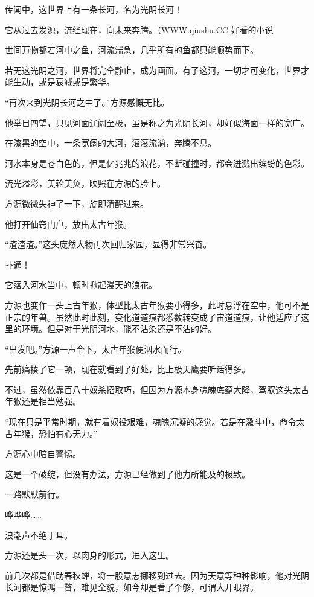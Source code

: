 
\begin{this_body}

传闻中，这世界上有一条长河，名为光阴长河！

它从过去发源，流经现在，向未来奔腾。（WWW.qiushu.CC 好看的小说

世间万物都若河中之鱼，河流湍急，几乎所有的鱼都只能顺势而下。

若无这光阴之河，世界将完全静止，成为画面。有了这河，一切才可变化，世界才能生动，或是衰减或是繁华。

“再次来到光阴长河之中了。”方源感慨无比。

他举目四望，只见河面辽阔至极，虽是称之为光阴长河，却好似海面一样的宽广。

在漆黑的空中，一条宽阔的大河，滚滚流淌，奔腾不息。

河水本身是苍白色的，但是亿兆兆的浪花，不断碰撞时，都会迸溅出缤纷的色彩。

流光溢彩，美轮美奂，映照在方源的脸上。

方源微微失神了一下，旋即清醒过来。

他打开仙窍门户，放出太古年猴。

“渣渣渣。”这头庞然大物再次回归家园，显得非常兴奋。

扑通！

它落入河水当中，顿时掀起漫天的浪花。

方源也变作一头上古年猴，体型比太古年猴要小得多，此时悬浮在空中，他可不是正宗的年兽。虽然此时此刻，变化道道痕都悉数转变成了宙道道痕，让他适应了这里的环境。但是对于光阴河水，能不沾染还是不沾的好。

“出发吧。”方源一声令下，太古年猴便泅水而行。

先前痛揍了它一顿，现在就看到了好处，比上极天鹰要听话得多。

不过，虽然依靠百八十奴杀招取巧，但因为方源本身魂魄底蕴大降，驾驭这头太古年猴还是相当勉强。

“现在只是平常时期，就有着奴役艰难，魂魄沉凝的感觉。若是在激斗中，命令太古年猴，恐怕有心无力。”

方源心中暗自警惕。

这是一个破绽，但没有办法，方源已经做到了他力所能及的极致。

一路默默前行。

哗哗哗……

浪潮声不绝于耳。

方源还是头一次，以肉身的形式，进入这里。

前几次都是借助春秋蝉，将一股意志挪移到过去。因为天意等种种影响，他对光阴长河都是惊鸿一瞥，难见全貌，如今却是看了个够，可谓大开眼界。


\end{this_body}
